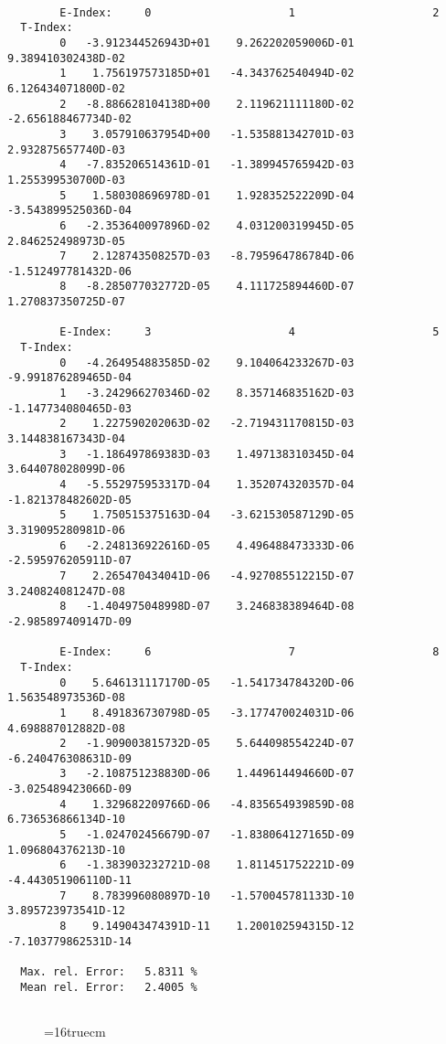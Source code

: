 \documentclass[12pt,dvipdfmx]{article}
\begin{document}
\begin{small}\begin{verbatim}

        E-Index:     0                     1                     2
  T-Index:
        0   -3.912344526943D+01    9.262202059006D-01    9.389410302438D-02
        1    1.756197573185D+01   -4.343762540494D-02    6.126434071800D-02
        2   -8.886628104138D+00    2.119621111180D-02   -2.656188467734D-02
        3    3.057910637954D+00   -1.535881342701D-03    2.932875657740D-03
        4   -7.835206514361D-01   -1.389945765942D-03    1.255399530700D-03
        5    1.580308696978D-01    1.928352522209D-04   -3.543899525036D-04
        6   -2.353640097896D-02    4.031200319945D-05    2.846252498973D-05
        7    2.128743508257D-03   -8.795964786784D-06   -1.512497781432D-06
        8   -8.285077032772D-05    4.111725894460D-07    1.270837350725D-07

        E-Index:     3                     4                     5
  T-Index:
        0   -4.264954883585D-02    9.104064233267D-03   -9.991876289465D-04
        1   -3.242966270346D-02    8.357146835162D-03   -1.147734080465D-03
        2    1.227590202063D-02   -2.719431170815D-03    3.144838167343D-04
        3   -1.186497869383D-03    1.497138310345D-04    3.644078028099D-06
        4   -5.552975953317D-04    1.352074320357D-04   -1.821378482602D-05
        5    1.750515375163D-04   -3.621530587129D-05    3.319095280981D-06
        6   -2.248136922616D-05    4.496488473333D-06   -2.595976205911D-07
        7    2.265470434041D-06   -4.927085512215D-07    3.240824081247D-08
        8   -1.404975048998D-07    3.246838389464D-08   -2.985897409147D-09

        E-Index:     6                     7                     8
  T-Index:
        0    5.646131117170D-05   -1.541734784320D-06    1.563548973536D-08
        1    8.491836730798D-05   -3.177470024031D-06    4.698887012882D-08
        2   -1.909003815732D-05    5.644098554224D-07   -6.240476308631D-09
        3   -2.108751238830D-06    1.449614494660D-07   -3.025489423066D-09
        4    1.329682209766D-06   -4.835654939859D-08    6.736536866134D-10
        5   -1.024702456679D-07   -1.838064127165D-09    1.096804376213D-10
        6   -1.383903232721D-08    1.811451752221D-09   -4.443051906110D-11
        7    8.783996080897D-10   -1.570045781133D-10    3.895723973541D-12
        8    9.149043474391D-11    1.200102594315D-12   -7.103779862531D-14

  Max. rel. Error:   5.8311 %
  Mean rel. Error:   2.4005 %


\end{verbatim}\end{small}
\begin{figure} \label{2.2.5c}
\epsfxsize=16truecm
\end{figure}
\newpage
\end{document}
